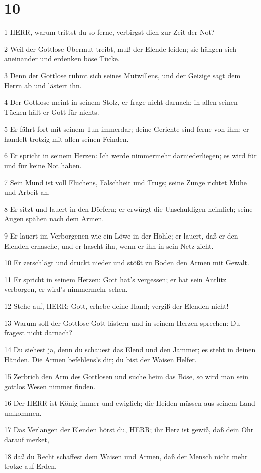 \chapter{10}

\par 1 HERR, warum trittst du so ferne, verbirgst dich zur Zeit der Not?
\par 2 Weil der Gottlose Übermut treibt, muß der Elende leiden; sie hängen sich aneinander und erdenken böse Tücke.
\par 3 Denn der Gottlose rühmt sich seines Mutwillens, und der Geizige sagt dem Herrn ab und lästert ihn.
\par 4 Der Gottlose meint in seinem Stolz, er frage nicht darnach; in allen seinen Tücken hält er Gott für nichts.
\par 5 Er fährt fort mit seinem Tun immerdar; deine Gerichte sind ferne von ihm; er handelt trotzig mit allen seinen Feinden.
\par 6 Er spricht in seinem Herzen: Ich werde nimmermehr darniederliegen; es wird für und für keine Not haben.
\par 7 Sein Mund ist voll Fluchens, Falschheit und Trugs; seine Zunge richtet Mühe und Arbeit an.
\par 8 Er sitzt und lauert in den Dörfern; er erwürgt die Unschuldigen heimlich; seine Augen spähen nach dem Armen.
\par 9 Er lauert im Verborgenen wie ein Löwe in der Höhle; er lauert, daß er den Elenden erhasche, und er hascht ihn, wenn er ihn in sein Netz zieht.
\par 10 Er zerschlägt und drückt nieder und stößt zu Boden den Armen mit Gewalt.
\par 11 Er spricht in seinem Herzen: Gott hat's vergessen; er hat sein Antlitz verborgen, er wird's nimmermehr sehen.
\par 12 Stehe auf, HERR; Gott, erhebe deine Hand; vergiß der Elenden nicht!
\par 13 Warum soll der Gottlose Gott lästern und in seinem Herzen sprechen: Du fragest nicht darnach?
\par 14 Du siehest ja, denn du schauest das Elend und den Jammer; es steht in deinen Händen. Die Armen befehlens's dir; du bist der Waisen Helfer.
\par 15 Zerbrich den Arm des Gottlosen und suche heim das Böse, so wird man sein gottlos Wesen nimmer finden.
\par 16 Der HERR ist König immer und ewiglich; die Heiden müssen aus seinem Land umkommen.
\par 17 Das Verlangen der Elenden hörst du, HERR; ihr Herz ist gewiß, daß dein Ohr darauf merket,
\par 18 daß du Recht schaffest dem Waisen und Armen, daß der Mensch nicht mehr trotze auf Erden.

